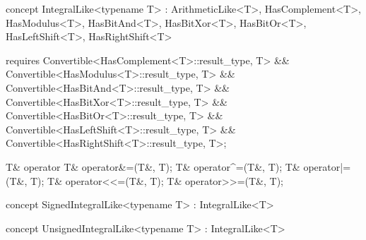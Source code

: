 \documentclass[american,twoside]{book}
\begin{document}
\begin{itemdescr}
\pnum
{}
\end{itemdescr}

\begin{itemdecl}
concept IntegralLike<typename T> 
  : ArithmeticLike<T>, HasComplement<T>, HasModulus<T>, HasBitAnd<T>, HasBitXor<T>, HasBitOr<T>,
    HasLeftShift<T>, HasRightShift<T> {
  requires Convertible<HasComplement<T>::result_type, T>
        && Convertible<HasModulus<T>::result_type, T>
        && Convertible<HasBitAnd<T>::result_type, T>
        && Convertible<HasBitXor<T>::result_type, T>
        && Convertible<HasBitOr<T>::result_type, T>
        && Convertible<HasLeftShift<T>::result_type, T>
        && Convertible<HasRightShift<T>::result_type, T>;

  T& operator%
  T& operator&=(T&, T);
  T& operator^=(T&, T);
  T& operator|=(T&, T);
  T& operator<<=(T&, T);
  T& operator>>=(T&, T);
}
\end{itemdecl}

\begin{itemdescr}
\pnum 
{}
\end{itemdescr}

\begin{itemdecl}
concept SignedIntegralLike<typename T> : IntegralLike<T> { }
\end{itemdecl}

\begin{itemdescr}
\pnum
{}

\pnum
{}
\end{itemdescr}

\begin{itemdecl}
concept UnsignedIntegralLike<typename T> : IntegralLike<T> { }
\end{itemdecl}

\begin{itemdescr}
\pnum
{}

\pnum
{}
\end{itemdescr}
\end{document}
